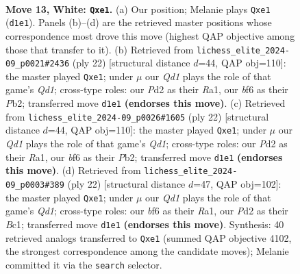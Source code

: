 \documentclass[11pt]{article}
\begin{document}
\clearpage

\begin{figure}[p]\centering
\begin{subfigure}{0.46\textwidth}\centering
\resizebox{\linewidth}{!}{%
\newchessgame
\chessboard[
  setfen={r1bq2k1/pppp1p1p/3n1bp1/8/8/1PN2P2/P1PP2PP/R1BQrBK1 w - - 0 13},
  showmover=false,
  pgfstyle=straightmove, color=movearrow, markmove={d1-e1}
]}
\caption{}
\end{subfigure}\hfill
\begin{subfigure}{0.46\textwidth}\centering
\resizebox{\linewidth}{!}{%
\newchessgame
\chessboard[
  setfen={r1bq2k1/pppp1ppp/3n1b2/8/3P4/2N5/PPP2PPP/R1BQrBK1 w - - 0 12},
  showmover=false,
  pgfstyle=straightmove, color=movearrow, markmove={d1-e1}
]}
\caption{}
\end{subfigure}
\\[4pt]
\begin{subfigure}{0.46\textwidth}\centering
\resizebox{\linewidth}{!}{%
\newchessgame
\chessboard[
  setfen={r1bq2k1/pppp1ppp/3n1b2/8/3P4/2N5/PPP2PPP/R1BQrBK1 w - - 0 12},
  showmover=false,
  pgfstyle=straightmove, color=movearrow, markmove={d1-e1}
]}
\caption{}
\end{subfigure}\hfill
\begin{subfigure}{0.46\textwidth}\centering
\resizebox{\linewidth}{!}{%
\newchessgame
\chessboard[
  setfen={r1bq2k1/pppp1ppp/3n1b2/8/3P4/2P5/PP3PPP/RNBQrBK1 w - - 0 12},
  showmover=false,
  pgfstyle=straightmove, color=movearrow, markmove={d1-e1}
]}
\caption{}
\end{subfigure}
\caption{\textbf{Move 13, White: \texttt{Qxe1}.} (a) Our position; Melanie plays \texttt{Qxe1} (\texttt{d1e1}). Panels (b)--(d) are the retrieved master positions whose correspondence most drove this move (highest QAP objective among those that transfer to it). (b) Retrieved from \texttt{lichess\_elite\_2024-09\_p0021\#2436} (ply 22) [structural distance $d$=44, QAP obj=110]: the master played \texttt{Qxe1}; under $\mu$ our \emph{Qd1} plays the role of that game's \emph{Qd1}; cross-type roles: our \emph{P}d2 as their \emph{R}a1, our \emph{b}f6 as their \emph{P}b2; transferred move \texttt{d1e1} \textbf{(endorses this move)}. (c) Retrieved from \texttt{lichess\_elite\_2024-09\_p0026\#1605} (ply 22) [structural distance $d$=44, QAP obj=110]: the master played \texttt{Qxe1}; under $\mu$ our \emph{Qd1} plays the role of that game's \emph{Qd1}; cross-type roles: our \emph{P}d2 as their \emph{R}a1, our \emph{b}f6 as their \emph{P}b2; transferred move \texttt{d1e1} \textbf{(endorses this move)}. (d) Retrieved from \texttt{lichess\_elite\_2024-09\_p0003\#389} (ply 22) [structural distance $d$=47, QAP obj=102]: the master played \texttt{Qxe1}; under $\mu$ our \emph{Qd1} plays the role of that game's \emph{Qd1}; cross-type roles: our \emph{b}f6 as their \emph{R}a1, our \emph{P}d2 as their \emph{B}c1; transferred move \texttt{d1e1} \textbf{(endorses this move)}. Synthesis: 40 retrieved analogs transferred to \texttt{Qxe1} (summed QAP objective 4102, the strongest correspondence among the candidate moves); Melanie committed it via the \texttt{search} selector.}
\label{fig:thought-m24}
\end{figure}
\end{document}
